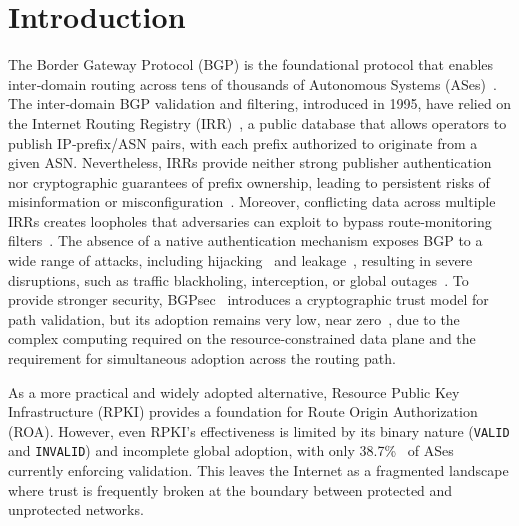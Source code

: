 \documentclass[conference]{IEEEtran}
\newcommand{\rj}[1]{{\color{blue}#1}}
\begin{document}
\section{Introduction}
\label{sec:introduction}

The Border Gateway Protocol (BGP) is the foundational protocol that enables inter‐domain routing across tens of thousands of Autonomous Systems (ASes)~\cite{rfc4271}. The inter‐domain BGP validation and filtering, introduced in 1995, have relied on the Internet Routing Registry (IRR)~\cite{DuIRATSc23}, a public database that allows operators to publish IP‐prefix/ASN pairs, with each prefix authorized to originate from a given ASN. Nevertheless, IRRs provide neither strong publisher authentication nor cryptographic guarantees of prefix ownership, leading to persistent risks of misinformation or misconfiguration~\cite{MahajanWA02,KangLRKC24IRRedicator,DuIRATSc23}. Moreover, conflicting data across multiple IRRs creates loopholes that adversaries can exploit to bypass route‐monitoring filters~\cite{BirgeLeeAR25}.
The absence of a native authentication mechanism exposes BGP to a wide range of attacks, including hijacking~\cite {prefixHijacking} and leakage~\cite {McDanielSS21BGPLeak}, resulting in severe disruptions, such as traffic blackholing, interception, or global outages~\cite{butler2009survey}. \rj{To provide stronger security, BGPsec~\cite{rfc8205BGPSec} introduces a cryptographic trust model for path validation, but its adoption remains very low, near zero~\cite{}, due to the complex computing required on the resource-constrained data plane and the requirement for simultaneous adoption across the routing path. }




\rj{As a more practical and widely adopted alternative, Resource Public Key Infrastructure (RPKI) \cite{RPKI} provides a foundation for Route Origin Authorization (ROA). However, even RPKI’s effectiveness is limited by its binary nature (\texttt{VALID} and \texttt{INVALID}) and incomplete global adoption, with only 38.7\%~\cite{qin2024understanding} of ASes currently enforcing validation. This leaves the Internet as a fragmented landscape where trust is frequently broken at the boundary between protected and unprotected networks.}
\end{document}
